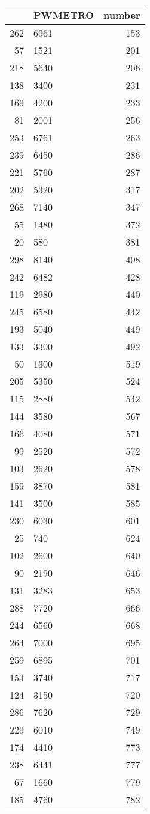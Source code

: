 \begin{table}[ht]
\centering
\begin{tabular}{rlr}
  \hline
 & PWMETRO & number \\ 
  \hline
262 & 6961 & 153 \\ 
  57 & 1521 & 201 \\ 
  218 & 5640 & 206 \\ 
  138 & 3400 & 231 \\ 
  169 & 4200 & 233 \\ 
  81 & 2001 & 256 \\ 
  253 & 6761 & 263 \\ 
  239 & 6450 & 286 \\ 
  221 & 5760 & 287 \\ 
  202 & 5320 & 317 \\ 
  268 & 7140 & 347 \\ 
  55 & 1480 & 372 \\ 
  20 & 580 & 381 \\ 
  298 & 8140 & 408 \\ 
  242 & 6482 & 428 \\ 
  119 & 2980 & 440 \\ 
  245 & 6580 & 442 \\ 
  193 & 5040 & 449 \\ 
  133 & 3300 & 492 \\ 
  50 & 1300 & 519 \\ 
  205 & 5350 & 524 \\ 
  115 & 2880 & 542 \\ 
  144 & 3580 & 567 \\ 
  166 & 4080 & 571 \\ 
  99 & 2520 & 572 \\ 
  103 & 2620 & 578 \\ 
  159 & 3870 & 581 \\ 
  141 & 3500 & 585 \\ 
  230 & 6030 & 601 \\ 
  25 & 740 & 624 \\ 
  102 & 2600 & 640 \\ 
  90 & 2190 & 646 \\ 
  131 & 3283 & 653 \\ 
  288 & 7720 & 666 \\ 
  244 & 6560 & 668 \\ 
  264 & 7000 & 695 \\ 
  259 & 6895 & 701 \\ 
  153 & 3740 & 717 \\ 
  124 & 3150 & 720 \\ 
  286 & 7620 & 729 \\ 
  229 & 6010 & 749 \\ 
  174 & 4410 & 773 \\ 
  238 & 6441 & 777 \\ 
  67 & 1660 & 779 \\ 
  185 & 4760 & 782 \\ 
   \hline
\end{tabular}
\end{table}
